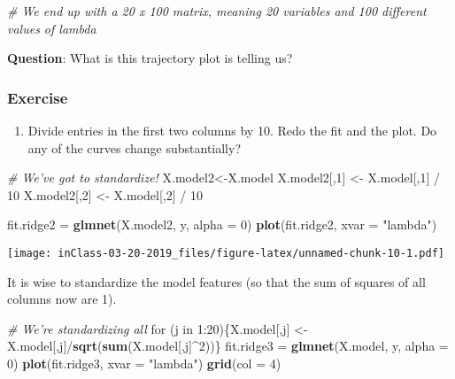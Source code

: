 \documentclass[]{article}
\newenvironment{Shaded}{\begin{snugshade}}{\end{snugshade}}
\newcommand{\KeywordTok}[1]{\textcolor[rgb]{0.13,0.29,0.53}{\textbf{{#1}}}}
\newcommand{\DataTypeTok}[1]{\textcolor[rgb]{0.13,0.29,0.53}{{#1}}}
\newcommand{\DecValTok}[1]{\textcolor[rgb]{0.00,0.00,0.81}{{#1}}}
\newcommand{\StringTok}[1]{\textcolor[rgb]{0.31,0.60,0.02}{{#1}}}
\newcommand{\CommentTok}[1]{\textcolor[rgb]{0.56,0.35,0.01}{\textit{{#1}}}}
\newcommand{\NormalTok}[1]{{#1}}
\providecommand{\tightlist}{%
  \setlength{\itemsep}{0pt}\setlength{\parskip}{0pt}}
\begin{document}
\begin{Shaded}
\begin{Highlighting}[]
\CommentTok{# We end up with a 20 x 100 matrix, meaning 20 variables and 100 different values of lambda }
\end{Highlighting}
\end{Shaded}

\textbf{Question}: What is this trajectory plot is telling us?

\subsubsection{Exercise}\label{exercise}

\begin{enumerate}
\def\labelenumi{\arabic{enumi}.}
\tightlist
\item
  Divide entries in the first two columns by 10. Redo the fit and the
  plot. Do any of the curves change substantially?
\end{enumerate}

\begin{Shaded}
\begin{Highlighting}[]
\CommentTok{# We've got to standardize!}
\NormalTok{X.model2<-X.model}
\NormalTok{X.model2[,}\DecValTok{1}\NormalTok{] <-}\StringTok{ }\NormalTok{X.model[,}\DecValTok{1}\NormalTok{] /}\StringTok{ }\DecValTok{10}
\NormalTok{X.model2[,}\DecValTok{2}\NormalTok{] <-}\StringTok{ }\NormalTok{X.model[,}\DecValTok{2}\NormalTok{] /}\StringTok{ }\DecValTok{10}

\NormalTok{fit.ridge2 =}\StringTok{ }\KeywordTok{glmnet}\NormalTok{(X.model2, y, }\DataTypeTok{alpha =} \DecValTok{0}\NormalTok{)}
\KeywordTok{plot}\NormalTok{(fit.ridge2, }\DataTypeTok{xvar =} \StringTok{"lambda"}\NormalTok{)}
\end{Highlighting}
\end{Shaded}

\texttt{[image: inClass-03-20-2019\_files/figure-latex/unnamed-chunk-10-1.pdf]}

It is wise to standardize the model features (so that the sum of squares
of all columns now are 1).

\begin{Shaded}
\begin{Highlighting}[]
\CommentTok{# We're standardizing all }
\NormalTok{for (j in }\DecValTok{1}\NormalTok{:}\DecValTok{20}\NormalTok{)\{X.model[,j] <-}\StringTok{ }\NormalTok{X.model[,j]/}\KeywordTok{sqrt}\NormalTok{(}\KeywordTok{sum}\NormalTok{(X.model[,j]^}\DecValTok{2}\NormalTok{))\}}
\NormalTok{fit.ridge3 =}\StringTok{ }\KeywordTok{glmnet}\NormalTok{(X.model, y, }\DataTypeTok{alpha =} \DecValTok{0}\NormalTok{)}
\KeywordTok{plot}\NormalTok{(fit.ridge3, }\DataTypeTok{xvar =} \StringTok{"lambda"}\NormalTok{)}
\KeywordTok{grid}\NormalTok{(}\DataTypeTok{col =} \DecValTok{4}\NormalTok{)}
\end{Highlighting}
\end{Shaded}
\end{document}
